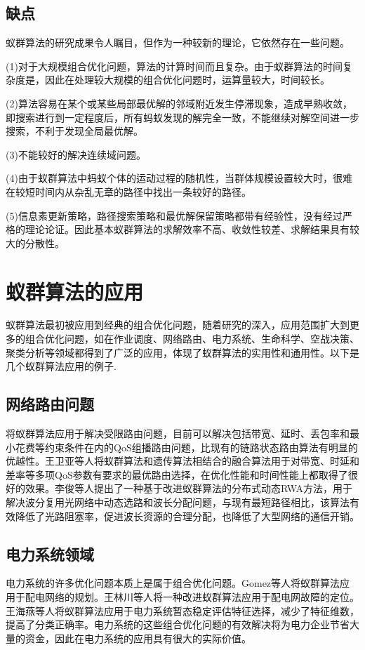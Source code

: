 \documentclass[12pt,nofonts]{ctexart}
\begin{document}
\subsection{缺点}
蚁群算法的研究成果令人瞩目，但作为一种较新的理论，它依然存在一些问题。

(1)对于大规模组合优化问题，算法的计算时间而且复杂。由于蚁群算法的时间复杂度是，因此在处理较大规模的组合优化问题时，运算量较大，时间较长。

(2)算法容易在某个或某些局部最优解的邻域附近发生停滞现象，造成早熟收敛，即搜索进行到一定程度后，所有蚂蚁发现的解完全一致，不能继续对解空间进一步搜索，不利于发现全局最优解。

(3)不能较好的解决连续域问题。

(4)由于蚁群算法中蚂蚁个体的运动过程的随机性，当群体规模设置较大时，很难在较短时间内从杂乱无章的路径中找出一条较好的路径。

(5)信息素更新策略，路径搜索策略和最优解保留策略都带有经验性，没有经过严格的理论论证。因此基本蚁群算法的求解效率不高、收敛性较差、求解结果具有较大的分散性。
\section{蚁群算法的应用}           
 蚁群算法最初被应用到经典的组合优化问题，随着研究的深入，应用范围扩大到更多的组合优化问题\cite{ref3}，如在作业调度、网络路由、电力系统、生命科学、空战决策、聚类分析等领域都得到了广泛的应用，体现了蚁群算法的实用性和通用性。以下是几个蚁群算法应用的例子.
 \subsection{网络路由问题}
 将蚁群算法应用于解决受限路由问题，目前可以解决包括带宽、延时、丢包率和最小花费等约束条件在内的QoS组播路由问题，比现有的链路状态路由算法有明显的优越性。王卫亚等人将蚁群算法和遗传算法相结合的融合算法用于对带宽、时延和差率等多项QoS参数有要求的最优路由选择，在优化性能和时间性能上都取得了很好的效果。李俊等人提出了一种基于改进蚁群算法的分布式动态RWA方法，用于解决波分复用光网络中动态选路和波长分配问题，与现有最短路径相比，该算法有效降低了光路阻塞率，促进波长资源的合理分配，也降低了大型网络的通信开销。
 \subsection{电力系统领域}
 电力系统的许多优化问题本质上是属于组合优化问题。Gomez等人将蚁群算法应用于配电网络的规划。王林川等人将一种改进蚁群算法应用于配电网故障的定位。王海燕等人将蚁群算法应用于电力系统暂态稳定评估特征选择，减少了特征维数，提高了分类正确率。电力系统的这些组合优化问题的有效解决将为电力企业节省大量的资金，因此在电力系统的应用具有很大的实际价值。
\end{document}
